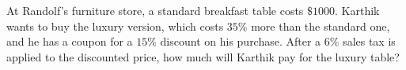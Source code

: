 At Randolf's furniture store, a standard breakfast table costs $\$1000$. Karthik wants to buy the luxury version, which costs $35\%$ more than the standard one, and he has a coupon for a $15\%$ discount on his purchase. After a $6\%$ sales tax is applied to the discounted price, how much will Karthik pay for the luxury table?
